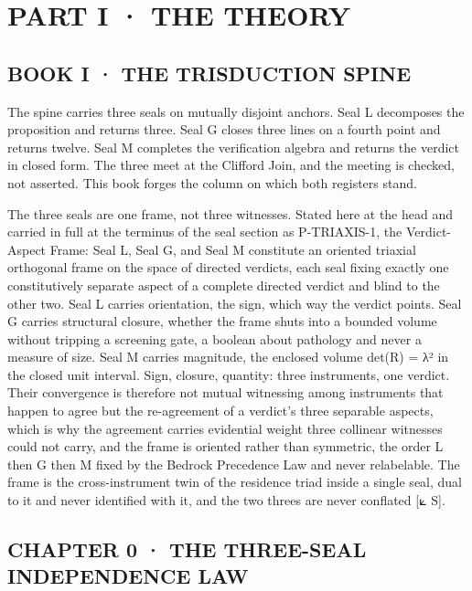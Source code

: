 \documentclass[10pt,twocolumn]{article}
\begin{document}
\hypertarget{part-i-the-theory}{%
\section{PART I · THE THEORY}\label{part-i-the-theory}}

\hypertarget{book-i-the-trisduction-spine}{%
\subsection{BOOK I · THE TRISDUCTION
SPINE}\label{book-i-the-trisduction-spine}}

The spine carries three seals on mutually disjoint anchors. Seal L
decomposes the proposition and returns three. Seal G closes three lines
on a fourth point and returns twelve. Seal M completes the verification
algebra and returns the verdict in closed form. The three meet at the
Clifford Join, and the meeting is checked, not asserted. This book
forges the column on which both registers stand.

The three seals are one frame, not three witnesses. Stated here at the
head and carried in full at the terminus of the seal section as
P-TRIAXIS-1, the Verdict-Aspect Frame: Seal L, Seal G, and Seal M
constitute an oriented triaxial orthogonal frame on the space of
directed verdicts, each seal fixing exactly one constitutively separate
aspect of a complete directed verdict and blind to the other two. Seal L
carries orientation, the sign, which way the verdict points. Seal G
carries structural closure, whether the frame shuts into a bounded
volume without tripping a screening gate, a boolean about pathology and
never a measure of size. Seal M carries magnitude, the enclosed volume
det(R) = λ² in the closed unit interval. Sign, closure, quantity: three
instruments, one verdict. Their convergence is therefore not mutual
witnessing among instruments that happen to agree but the re-agreement
of a verdict's three separable aspects, which is why the agreement
carries evidential weight three collinear witnesses could not carry, and
the frame is oriented rather than symmetric, the order L then G then M
fixed by the Bedrock Precedence Law and never relabelable. The frame is
the cross-instrument twin of the residence triad inside a single seal,
dual to it and never identified with it, and the two threes are never
conflated {[}⟀ S{]}.

\hypertarget{chapter-0-the-three-seal-independence-law}{%
\subsection{CHAPTER 0 · THE THREE-SEAL INDEPENDENCE
LAW}\label{chapter-0-the-three-seal-independence-law}}
\end{document}
